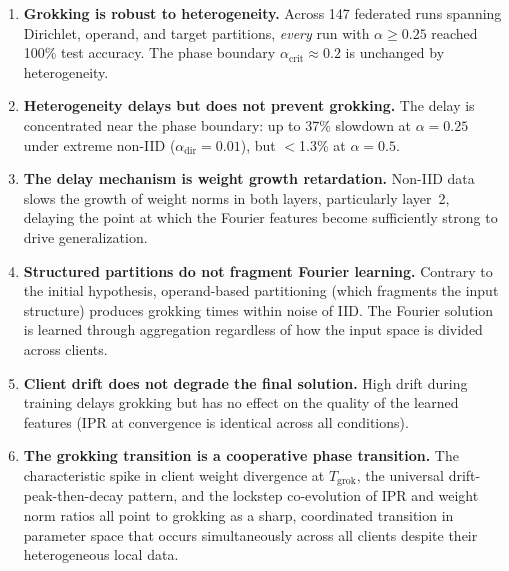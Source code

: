 \documentclass[11pt]{article}
\begin{document}
\begin{enumerate}
  \item \textbf{Grokking is robust to heterogeneity.}  Across 147 federated
        runs spanning Dirichlet, operand, and target partitions,
        \emph{every} run with $\alpha \geq 0.25$ reached 100\% test
        accuracy.  The phase boundary $\alpha_{\mathrm{crit}} \approx 0.2$
        is unchanged by heterogeneity.

  \item \textbf{Heterogeneity delays but does not prevent grokking.}
        The delay is concentrated near the phase boundary: up to 37\%
        slowdown at $\alpha{=}0.25$ under extreme non-IID
        ($\alpha_{\mathrm{dir}}{=}0.01$), but $<$1.3\% at $\alpha{=}0.5$.

  \item \textbf{The delay mechanism is weight growth retardation.}
        Non-IID data slows the growth of weight norms in both layers,
        particularly layer~2, delaying the point at which the Fourier
        features become sufficiently strong to drive generalization.

  \item \textbf{Structured partitions do not fragment Fourier learning.}
        Contrary to the initial hypothesis, operand-based partitioning
        (which fragments the input structure) produces grokking times
        within noise of IID.  The Fourier solution is learned through
        aggregation regardless of how the input space is divided across
        clients.

  \item \textbf{Client drift does not degrade the final solution.}  High
        drift during training delays grokking but has no effect on the
        quality of the learned features (IPR at convergence is identical
        across all conditions).

  \item \textbf{The grokking transition is a cooperative phase transition.}
        The characteristic spike in client weight divergence at
        $T_{\mathrm{grok}}$, the universal drift-peak-then-decay pattern,
        and the lockstep co-evolution of IPR and weight norm ratios all
        point to grokking as a sharp, coordinated transition in parameter
        space that occurs simultaneously across all clients despite their
        heterogeneous local data.
\end{enumerate}
\end{document}
